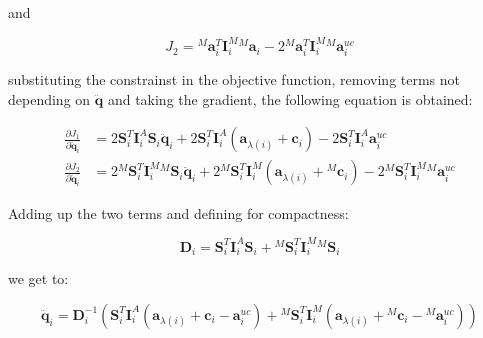 and

\begin{equation}
    J _2 = {} ^M \mathbf{a} ^T _i \mathbf{I} ^M _i {} ^M \mathbf{a} _i - 2 {} ^M \mathbf{a} ^T _i \mathbf{I} ^M _i {} ^M \mathbf{a} ^{uc} _i
\end{equation}

substituting the constrainst in the objective function, removing terms not depending on $\ddot{\mathbf{q}}$ and taking the gradient, the following equation is obtained:

\begin{align}
    \frac{\partial J _1}{\partial \ddot{\mathbf{q}} _i} & = 2 \mathbf{S} ^T _i \mathbf{I} ^A _i \mathbf{S} _i \ddot{\mathbf{q}} _i + 2 \mathbf{S} ^T _i \mathbf{I} ^A _i (\mathbf{a} _{\lambda (i)} + \mathbf{c} _i) - 2 \mathbf{S} ^T _i \mathbf{I} ^A _i \mathbf{a} ^{uc} _i \nonumber                                        \\
    \frac{\partial J _2}{\partial \ddot{\mathbf{q}} _i} & = 2 {} ^M \mathbf{S} ^T _i \mathbf{I} ^M _i {} ^M \mathbf{S} _i \ddot{\mathbf{q}} _i + 2 {} ^M  \mathbf{S} ^T _i \mathbf{I} ^M _i (\mathbf{a} _{\lambda (i)} + {} ^M  \mathbf{c} _i) - 2 {} ^M \mathbf{S} ^T _i \mathbf{I} ^M _i {} ^M \mathbf{a} ^{uc} _i  \nonumber
\end{align}

Adding up the two terms and defining for compactness:

\begin{equation}
    \mathbf{D} _i = \mathbf{S} ^T _i \mathbf{I} ^A _i \mathbf{S} _i + {} ^M \mathbf{S} ^T _i \mathbf{I} ^M _i {} ^M \mathbf{S} _i
\end{equation}

we get to:

\begin{equation}
    \ddot{\mathbf{q}} _i = \mathbf{D} _i ^{-1} (\mathbf{S} ^T _i \mathbf{I} ^A _i (\mathbf{a} _{\lambda (i)} + \mathbf{c} _i - \mathbf{a} ^{uc} _i) + {} ^M \mathbf{S} ^T _i \mathbf{I} ^M _i ( \mathbf{a} _{\lambda (i)} + {} ^M \mathbf{c} _i - {} ^M \mathbf{a} ^{uc} _i))
\end{equation}

